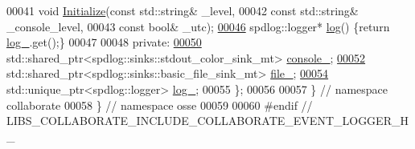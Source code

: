 \begin{DoxyCode}
00041   \textcolor{keywordtype}{void} \hyperlink{classosse_1_1collaborate_1_1_event_logger_ad76479bfe7482caf22f6fd9e70445640}{Initialize}(\textcolor{keyword}{const} std::string& \_level,
00042                   \textcolor{keyword}{const} std::string& \_console\_level,
00043                   \textcolor{keyword}{const} \textcolor{keywordtype}{bool}& \_utc);
\hyperlink{classosse_1_1collaborate_1_1_event_logger_a76adbd3cee03eb159797eb14dd496bc6}{00046}   spdlog::logger* \hyperlink{classosse_1_1collaborate_1_1_event_logger_a76adbd3cee03eb159797eb14dd496bc6}{log}() \{\textcolor{keywordflow}{return} \hyperlink{classosse_1_1collaborate_1_1_event_logger_af5ebd14804c7ffd7a584e9a389d47f53}{log\_}.get();\}
00047 
00048  \textcolor{keyword}{private}:
\hyperlink{classosse_1_1collaborate_1_1_event_logger_a251a1f450efb2a8b48689dff5056e8cd}{00050}   std::shared\_ptr<spdlog::sinks::stdout\_color\_sink\_mt> \hyperlink{classosse_1_1collaborate_1_1_event_logger_a251a1f450efb2a8b48689dff5056e8cd}{console\_};
\hyperlink{classosse_1_1collaborate_1_1_event_logger_a42a6aa81525ec44dcee5b76d8a238e5b}{00052}   std::shared\_ptr<spdlog::sinks::basic\_file\_sink\_mt> \hyperlink{classosse_1_1collaborate_1_1_event_logger_a42a6aa81525ec44dcee5b76d8a238e5b}{file\_};
\hyperlink{classosse_1_1collaborate_1_1_event_logger_af5ebd14804c7ffd7a584e9a389d47f53}{00054}   std::unique\_ptr<spdlog::logger> \hyperlink{classosse_1_1collaborate_1_1_event_logger_af5ebd14804c7ffd7a584e9a389d47f53}{log\_};
00055 \};
00056 
00057 \}  \textcolor{comment}{// namespace collaborate}
00058 \}  \textcolor{comment}{// namespace osse}
00059 
00060 \textcolor{preprocessor}{#endif  // LIBS\_COLLABORATE\_INCLUDE\_COLLABORATE\_EVENT\_LOGGER\_H\_}
\end{DoxyCode}

